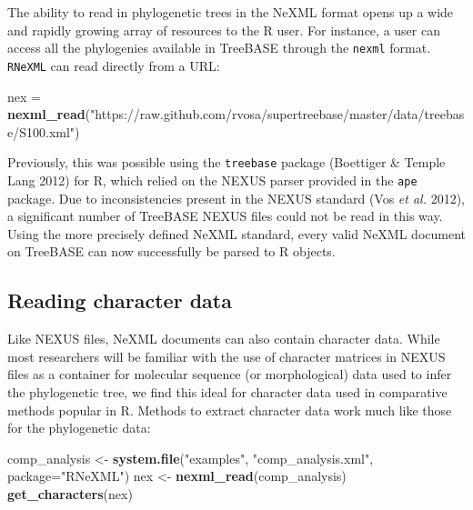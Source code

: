 \documentclass[author-year, review, 11pt]{components/elsarticle} %
\newenvironment{Shaded}{\begin{snugshade}}{\end{snugshade}}
\newcommand{\KeywordTok}[1]{\textcolor[rgb]{0.13,0.29,0.53}{\textbf{{#1}}}}
\newcommand{\DataTypeTok}[1]{\textcolor[rgb]{0.13,0.29,0.53}{{#1}}}
\newcommand{\StringTok}[1]{\textcolor[rgb]{0.31,0.60,0.02}{{#1}}}
\newcommand{\NormalTok}[1]{{#1}}
\begin{document}
The ability to read in phylogenetic trees in the NeXML format opens up a
wide and rapidly growing array of resources to the R user. For instance,
a user can access all the phylogenies available in TreeBASE through the
\texttt{nexml} format. \texttt{RNeXML} can read directly from a URL:

\begin{Shaded}
\begin{Highlighting}[]
\NormalTok{nex =}\StringTok{ }\KeywordTok{nexml_read}\NormalTok{(}\StringTok{"https://raw.github.com/rvosa/supertreebase/master/data/treebase/S100.xml"}\NormalTok{)}
\end{Highlighting}
\end{Shaded}

Previously, this was possible using the \texttt{treebase} package
(Boettiger \& {Temple Lang} 2012) for R, which relied on the NEXUS
parser provided in the \texttt{ape} package. Due to inconsistencies
present in the NEXUS standard (Vos \emph{et al.} 2012), a significant
number of TreeBASE NEXUS files could not be read in this way. Using the
more precisely defined NeXML standard, every valid NeXML document on
TreeBASE can now successfully be parsed to R objects.

\subsection{Reading character data}\label{reading-character-data}

Like NEXUS files, NeXML documents can also contain character data. While
most researchers will be familiar with the use of character matrices in
NEXUS files as a container for molecular sequence (or morphological)
data used to infer the phylogenetic tree, we find this ideal for
character data used in comparative methods popular in R. Methods to
extract character data work much like those for the phylogenetic data:

\begin{Shaded}
\begin{Highlighting}[]
\NormalTok{comp_analysis <-}\StringTok{ }\KeywordTok{system.file}\NormalTok{(}\StringTok{"examples"}\NormalTok{, }\StringTok{"comp_analysis.xml"}\NormalTok{, }\DataTypeTok{package=}\StringTok{"RNeXML"}\NormalTok{)}
\NormalTok{nex <-}\StringTok{ }\KeywordTok{nexml_read}\NormalTok{(comp_analysis)}
\KeywordTok{get_characters}\NormalTok{(nex)}
\end{Highlighting}
\end{Shaded}
\end{document}
